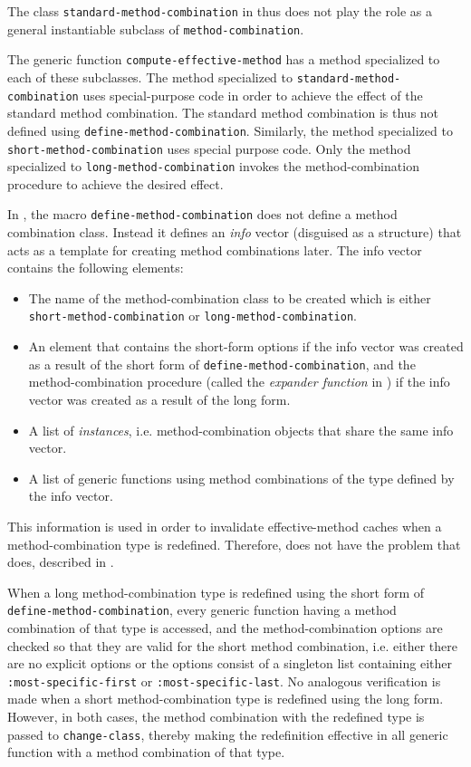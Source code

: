 The class \texttt{standard-method-combination} in \ccl{} thus does not
play the role as a general instantiable subclass of
\texttt{method-combination}.

The generic function \texttt{compute-effective-method} has a method
specialized to each of these subclasses.  The method specialized to
\texttt{standard-method-combination} uses special-purpose code in
order to achieve the effect of the standard method combination.  The
standard method combination is thus not defined using
\texttt{define-method-combination}.  Similarly, the method specialized
to \texttt{short-method-combination} uses special purpose code.  Only
the method specialized to \texttt{long-method-combination} invokes the
method-combination procedure to achieve the desired effect.

In \ccl{}, the macro \texttt{define-method-combination} does not
define a method combination class.  Instead it defines an \emph{info}
vector (disguised as a structure) that acts as a template for creating
method combinations later.  The info vector contains the following
elements:

\begin{itemize}
\item The name of the method-combination class to be created which is
  either \texttt{short-method-combination} or
  \texttt{long-method-combination}.
\item An element that contains the short-form options if the info
  vector was created as a result of the short form of
  \texttt{define-method-combination}, and the method-combination
  procedure (called the \emph{expander function} in \ccl{}) if the
  info vector was created as a result of the long form.
\item A list of \emph{instances}, i.e. method-combination objects that
  share the same info vector.
\item A list of generic functions using method combinations of the
  type defined by the info vector.
\end{itemize}

This information is used in order to invalidate effective-method
caches when a method-combination type is redefined.  Therefore, \ccl{}
does not have the problem that \pcl{} does, described in
.

When a long method-combination type is redefined using the short form
of \texttt{define-method-combination}, every generic function having
a method combination of that type is accessed, and the
method-combination options are checked so that they are valid for the
short method combination, i.e. either there are no explicit options or
the options consist of a singleton list containing either
\texttt{:most-specific-first} or \texttt{:most-specific-last}.  No
analogous verification is made when a short method-combination type is
redefined using the long form.  However, in both cases, the method
combination with the redefined type is passed to
\texttt{change-class}, thereby making the redefinition effective in
all generic function with a method combination of that type.

